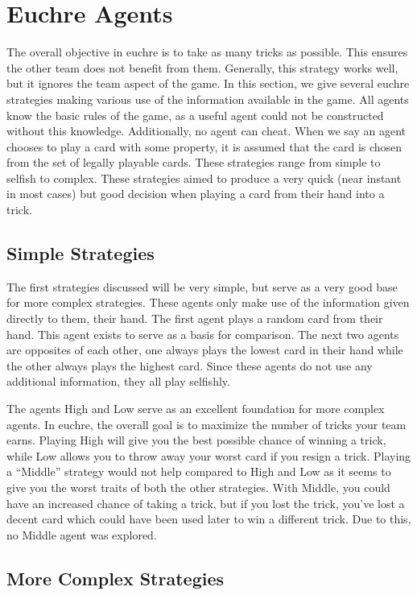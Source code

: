 
\section{Euchre Agents}

The overall objective in euchre is to take as many tricks as possible. This ensures the other team does not benefit from them.
Generally, this strategy works well, but it ignores the team aspect of the game. In this section, we give several euchre strategies
making various use of the information available in the game. All agents know the basic rules of the game, as a useful agent could
not be constructed without this knowledge. Additionally, no agent can cheat. When we say an agent chooses to play a card with some
property, it is assumed that the card is chosen from the set of legally playable cards. These strategies range from simple to selfish to
complex. These strategies aimed to produce a very quick (near instant in most cases) but good decision when playing a card from
their hand into a trick.


\subsection{Simple Strategies}

The first strategies discussed will be very simple, but serve as a very good base for more complex strategies. These agents only make use
of the information given directly to them, their hand. The first agent plays a random card from their hand. This agent exists to serve
as a basis for comparison. The next two agents are opposites of each other, one always plays the lowest card in their hand while
the other always plays the highest card. Since these agents do not use any additional information, they all play selfishly.

The agents High and Low serve as an excellent foundation for more complex agents. In euchre, the overall goal is to maximize the number
of tricks your team earns. Playing High will give you the best possible chance of winning a trick, while Low allows you to throw away
your worst card if you resign a trick. Playing a ``Middle'' strategy would not help compared to High and Low as it seems to give you
the worst traits of both the other strategies. With Middle, you could have an increased chance of taking a trick, but if you lost the trick,
you've lost a decent card which could have been used later to win a different trick. Due to this, no Middle agent was explored.


\subsection{More Complex Strategies}

